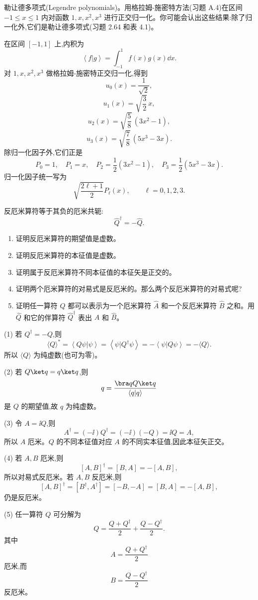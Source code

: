 \begin{question}
勒让德多项式(Legendre polynomials)。用格拉姆-施密特方法(习题 A.4)在区间 $-1\leq x\leq 1$ 内对函数 $1,x,x^2,x^3$ 进行正交归一化。你可能会认出这些结果:除了归一化外,它们是勒让德多项式(习题 2.64 和表 4.1)。
\end{question}
\begin{solution}
在区间 $[-1,1]$ 上,内积为
\[
\left\langle f|g \right\rangle=\int_{-1}^{1}f(x)g(x)\dd x.
\]
对 $1,x,x^2,x^3$ 做格拉姆-施密特正交归一化,得到
\[
u_0(x)=\frac1{\sqrt2},
\]
\[
u_1(x)=\sqrt{\frac32}\,x,
\]
\[
u_2(x)=\sqrt{\frac58}\,(3x^2-1),
\]
\[
u_3(x)=\sqrt{\frac78}\,(5x^3-3x).
\]
除归一化因子外,它们正是
\[
P_0=1,
\quad P_1=x,
\quad P_2=\frac12(3x^2-1),
\quad P_3=\frac12(5x^3-3x).
\]
归一化因子统一写为
\[
\sqrt{\frac{2\ell+1}{2}}P_\ell(x),
\qquad \ell=0,1,2,3.
\]
\end{solution}

\begin{question}
反厄米算符等于其负的厄米共轭:
\[
\hat Q^\dagger=-\hat Q.\tag{3.111}
\]
\begin{enumerate}
\item 证明反厄米算符的期望值是虚数。
\item 证明反厄米算符的本征值是虚数。
\item 证明属于反厄米算符不同本征值的本征矢是正交的。
\item 证明两个厄米算符的对易式是反厄米的。那么两个反厄米算符的对易式呢?
\item 证明任一算符 $\hat Q$ 都可以表示为一个厄米算符 $\hat A$ 和一个反厄米算符 $\hat B$ 之和。用 $\hat Q$ 和它的伴算符 $\hat Q^\dagger$ 表出 $\hat A$ 和 $\hat B$。
\end{enumerate}
\end{question}
\begin{solution}
(1) 若 $Q^\dagger=-Q$,则
\[
\langle Q\rangle^*=\left\langle Q\psi|\psi \right\rangle=\left\langle \psi|Q^\dagger\psi \right\rangle=-\left\langle \psi|Q\psi \right\rangle=-\langle Q\rangle.
\]
所以 $\langle Q\rangle$ 为纯虚数(也可为零)。

(2) 若 $Q\ket q=q\ket q$,则
\[
q=\frac{\bra qQ\ket q}{\left\langle q|q \right\rangle}
\]
是 $Q$ 的期望值,故 $q$ 为纯虚数。

(3) 令 $A=\ii Q$,则
\[
A^\dagger=(-\ii)Q^\dagger=(-\ii)(-Q)=\ii Q=A,
\]
所以 $A$ 厄米。$Q$ 的不同本征值对应 $A$ 的不同实本征值,因此本征矢正交。

(4) 若 $A,B$ 厄米,则
\[
[A,B]^\dagger=[B,A]=-[A,B],
\]
所以对易式反厄米。若 $A,B$ 反厄米,则
\[
[A,B]^\dagger=[B^\dagger,A^\dagger]=[-B,-A]=[B,A]=-[A,B],
\]
仍是反厄米。

(5) 任一算符 $Q$ 可分解为
\[
Q=\frac{Q+Q^\dagger}{2}+\frac{Q-Q^\dagger}{2}.
\]
其中
\[
\boxed{A=\frac{Q+Q^\dagger}{2}}
\]
厄米,而
\[
\boxed{B=\frac{Q-Q^\dagger}{2}}
\]
反厄米。
\end{solution}


